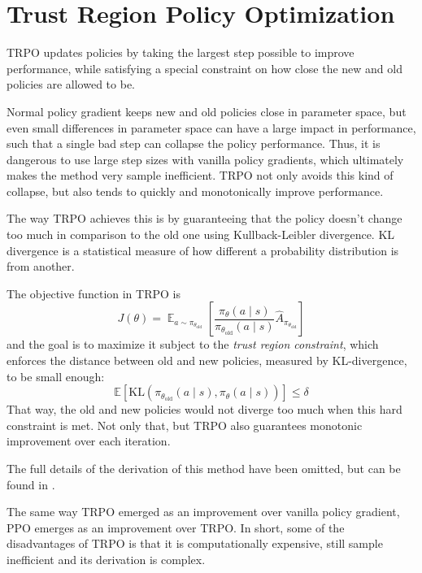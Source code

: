 \section{Trust Region Policy Optimization}
TRPO updates policies by taking the largest step possible to improve performance, while satisfying a special constraint on how close the new and old policies are allowed to be.

Normal policy gradient keeps new and old policies close in parameter space, but even small differences in parameter space can have a large impact in performance, such that a single bad step can collapse the policy performance. Thus, it is dangerous to use large step sizes with vanilla policy gradients, which ultimately makes the method very sample inefficient. TRPO not only avoids this kind of collapse, but also tends to quickly and monotonically improve performance.

The way TRPO achieves this is by guaranteeing that the policy doesn't change too much in comparison to the old one using Kullback-Leibler divergence. KL divergence is a statistical measure of how different a probability distribution is from another.

The objective function in TRPO is
\begin{equation}
    J(\theta) = \displaystyle\mathop{\mathbb{E}}_{a \sim \pi_{\theta_\text{old}}}\left[\frac{\pi_{\theta}(a \mid s)}{\pi_{\theta_\text{old}}(a \mid s)}\hat{A}_{\pi_{\theta_\text{old}}}\right]
\end{equation}
and the goal is to maximize it subject to the \textit{trust region constraint}, which enforces the distance between old and new policies, measured by KL-divergence, to be small enough:
\begin{equation}
    \mathbb{E}[\text{KL}(\pi_{\theta_\text{old}}(a \mid s), \pi_\theta(a \mid s))] \leq \delta
\end{equation}
That way, the old and new policies would not diverge too much when this hard constraint is met. Not only that, but TRPO also guarantees monotonic improvement over each iteration.

The full details of the derivation of this method have been omitted, but can be found in \cite{DBLP:journals/corr/SchulmanLMJA15}.

The same way TRPO emerged as an improvement over vanilla policy gradient, PPO emerges as an improvement over TRPO. In short, some of the disadvantages of TRPO is that it is computationally expensive, still sample inefficient and its derivation is complex.

